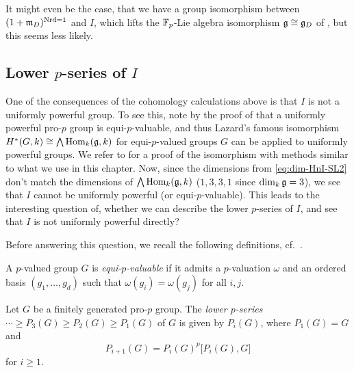 
It might even be the case, that we have a group isomorphism between $(1+\mathfrak{m}_{D})^{\operatorname{Nrd} = 1}$ and $I$, which lifts the $\mathbb{F}_{p}$-Lie algebra isomorphism $\mathfrak{g} \cong \mathfrak{g}_{D}$ of , but this seems less likely.

\subsection{Lower \texorpdfstring{$p$}{p}-series of \texorpdfstring{$I$}{I}}%
\label{subsec:lower-p-series-SL2}

One of the consequences of the cohomology calculations above is that $I$ is not a uniformly powerful group. To see this, note by the proof of \cite[Thm.~3.3.3]{Laz-complements} that a uniformly powerful pro-$p$ group is equi-$p$-valuable, and thus Lazard's famous isomorphism $H^{*}(G,k) \cong \bigwedge \operatorname{Hom}_{k}(\mathfrak{g},k)$ for equi-$p$-valued groups $G$ can be applied to uniformly powerful groups. We refer to \cite[Cor.~6.3]{Sor} for a proof of the isomorphism with methods similar to what we use in this chapter. Now, since the dimensions from \eqref{eq:dim-HnI-SL2} don't match the dimensions of $\bigwedge \operatorname{Hom}_{k}(\mathfrak{g},k)$ ($1,3,3,1$ since $\dim_{k} \mathfrak{g} = 3$), we see that $I$ cannot be uniformly powerful (or equi-$p$-valuable). This leads to the interesting question of, whether we can describe the lower $p$-series of $I$, and see that $I$ is not uniformly powerful directly?

Before answering this question, we recall the following definitions, cf.\ \cite[Def.~1.15, Cor.~1.20, Def.~3.1 and Def.~4.1]{analytic_pro-p_groups}.
\begin{definition}
  A $p$-valued group $G$ is \emph{equi-$p$-valuable} if it admits a $p$-valuation $\omega$ and an ordered basis $(g_{1},\dotsc,g_{d})$ such that $\omega(g_{i}) = \omega(g_{j})$ for all $i,j$.
\end{definition}

\begin{definition}
  Let $G$ be a finitely generated pro-$p$ group. The \emph{lower $p$-series} $\dotsb \geq P_{3}(G) \geq P_{2}(G) \geq P_{1}(G)$ of $G$ is given by $P_{i}(G)$, where $P_{1}(G) = G$ and
  \begin{equation*}
    P_{i+1}(G) = P_{i}(G)^{p}\bigl[ P_{i}(G),G \bigr]
  \end{equation*}
  for $i \geq 1$.
\end{definition}


